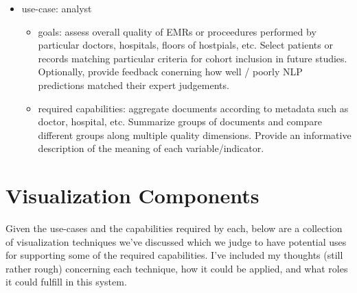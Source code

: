 \documentclass[11pt,letterpaper]{article}
\begin{document}
\begin{itemize}
\item use-case: analyst
\begin{itemize}
\item goals: assess overall quality of EMRs or proceedures performed by particular doctors, hospitals, floors of hostpials, etc. Select patients or records matching particular criteria for cohort inclusion in future studies. Optionally, provide feedback conerning how well / poorly NLP predictions matched their expert judgements.
\item required capabilities: aggregate documents according to metadata such as doctor, hospital, etc. Summarize groups of documents and compare different groups along multiple quality dimensions. Provide an informative description of the meaning of each variable/indicator.
\end{itemize}


\end{itemize}

\section{Visualization Components}

Given the use-cases and the capabilities required by each, below are a collection of visualization techniques we've discussed which we judge to have potential uses for supporting some of the required capabilities. I've included my thoughts (still rather rough) concerning each technique, how it could be applied, and what roles it could fulfill in this system.
\end{document}
